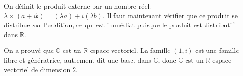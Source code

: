 \documentclass[a4paper,12pt]{exam}
\begin{document}
\begin{questions}
\begin{solution}
 On définit le produit externe par un nombre réel: $\lambda\times(a+ib)=(\lambda a)+i(\lambda b)$. Il faut maintenant vérifier que ce produit se distribue sur l'addition, ce qui est immédiat puisque le produit est distributif dans $\mathbb R$.
 
 On a prouvé que $\mathbb C$ est un $\mathbb R$-espace vectoriel. La famille $(1,i)$ est une famille libre et génératrice, autrement dit une base, dans $\mathbb C$, donc $\mathbb C$ est un $\mathbb R$-espace vectoriel de dimension 2.
\end{solution}
\end{questions}
\end{document}
